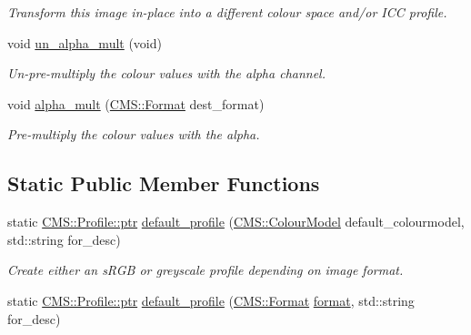 \begin{DoxyCompactItemize}
\begin{DoxyCompactList}\small\item\em Transform this image in-\/place into a different colour space and/or I\+CC profile. \end{DoxyCompactList}\item 
void \hyperlink{class_photo_finish_1_1_image_abd2dae98733ae83ccf7b57256f00a3ba}{un\+\_\+alpha\+\_\+mult} (void)
\begin{DoxyCompactList}\small\item\em Un-\/pre-\/multiply the colour values with the alpha channel. \end{DoxyCompactList}\item 
void \hyperlink{class_photo_finish_1_1_image_a4e491dfdc87676fac9f10b0ae15503ec}{alpha\+\_\+mult} (\hyperlink{class_c_m_s_1_1_format}{C\+M\+S\+::\+Format} dest\+\_\+format)
\begin{DoxyCompactList}\small\item\em Pre-\/multiply the colour values with the alpha. \end{DoxyCompactList}\end{DoxyCompactItemize}
\subsection*{Static Public Member Functions}
\begin{DoxyCompactItemize}
\item 
static \hyperlink{class_c_m_s_1_1_profile_a7d5a80e1317d17dbfdf5ae69820ab08b}{C\+M\+S\+::\+Profile\+::ptr} \hyperlink{class_photo_finish_1_1_image_a0c0d0a10aaa05beca416be3b9e75810a}{default\+\_\+profile} (\hyperlink{namespace_c_m_s_a9cb18b5da51a22c3c9dd25a5c9048e42}{C\+M\+S\+::\+Colour\+Model} default\+\_\+colourmodel, std\+::string for\+\_\+desc)
\begin{DoxyCompactList}\small\item\em Create either an s\+R\+GB or greyscale profile depending on image format. \end{DoxyCompactList}\item 
static \hyperlink{class_c_m_s_1_1_profile_a7d5a80e1317d17dbfdf5ae69820ab08b}{C\+M\+S\+::\+Profile\+::ptr} \hyperlink{class_photo_finish_1_1_image_a07287a4910a554444f3d637a82c7fa7e}{default\+\_\+profile} (\hyperlink{class_c_m_s_1_1_format}{C\+M\+S\+::\+Format} \hyperlink{class_photo_finish_1_1_image_af3e7c8a8d2da4244df61aee4179f3285}{format}, std\+::string for\+\_\+desc)
\end{DoxyCompactItemize}


